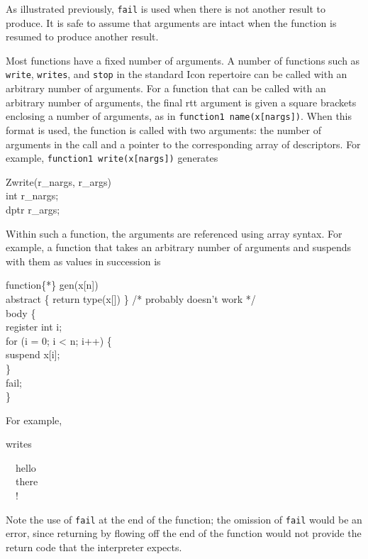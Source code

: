 \noindent
As illustrated previously, \texttt{fail} is used when there is not another
result to produce. It is safe to assume that arguments
are intact when the function is resumed to produce another result.

Most functions have a fixed number of arguments. A number of
functions such as \texttt{write}, \texttt{writes},
and \texttt{stop} in the standard Icon repertoire can be called with an
arbitrary number of arguments. For a function that can be called with
an arbitrary number of arguments, the final rtt argument is given a
square brackets enclosing a number of arguments, as in
\texttt{function{1} name(x[nargs])}. When this format is used, the function is
called with two arguments: the number of arguments in the call and a
pointer to the corresponding array of descriptors. For example,
\texttt{function{1} write(x[nargs])} generates

\goodbreak
\begin{iconcode}
Zwrite(r\_nargs, r\_args)\\
int r\_nargs;\\
dptr r\_args;
\end{iconcode}

Within such a function,
the arguments are referenced using array syntax. For example, a
function that takes an arbitrary number of arguments and suspends with
them as values in succession is

\goodbreak
\begin{iconcode}
function\{*\} gen(x[n])\\
{\color{red} abstract \{ return type(x[]) \} /* probably doesn't work */ } \\
body \{\\
\>register int i;\\
\>for (i = 0; i < n; i++) \{\\
\>\>suspend x[i];\\
\>\}\\
\>fail;\\
\}
\end{iconcode}

\noindent
For example,

\noindent
writes

\goodbreak
\begin{iconcode}
\ \ hello\\
\ \ there\\
\ \ !
\end{iconcode}

\noindent
Note the use of \texttt{fail} at the end of the function; the omission of
\texttt{fail} would be an error, since returning by flowing off the end of the
function would not provide the return code that the interpreter expects.

